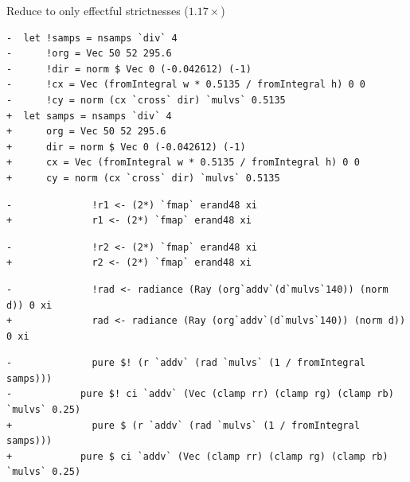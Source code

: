 \documentclass[8pt]{beamer}
\begin{document}

\begin{frame}[fragile]{Reduce to only effectful strictnesses ($1.17\times$)}
\begin{verbatim}
-  let !samps = nsamps `div` 4
-      !org = Vec 50 52 295.6
-      !dir = norm $ Vec 0 (-0.042612) (-1)
-      !cx = Vec (fromIntegral w * 0.5135 / fromIntegral h) 0 0
-      !cy = norm (cx `cross` dir) `mulvs` 0.5135
+  let samps = nsamps `div` 4
+      org = Vec 50 52 295.6
+      dir = norm $ Vec 0 (-0.042612) (-1)
+      cx = Vec (fromIntegral w * 0.5135 / fromIntegral h) 0 0
+      cy = norm (cx `cross` dir) `mulvs` 0.5135
\end{verbatim}
\begin{verbatim}
-              !r1 <- (2*) `fmap` erand48 xi
+              r1 <- (2*) `fmap` erand48 xi
\end{verbatim}

\begin{verbatim}
-              !r2 <- (2*) `fmap` erand48 xi
+              r2 <- (2*) `fmap` erand48 xi
\end{verbatim}

\begin{verbatim}
-              !rad <- radiance (Ray (org`addv`(d`mulvs`140)) (norm d)) 0 xi
+              rad <- radiance (Ray (org`addv`(d`mulvs`140)) (norm d)) 0 xi
\end{verbatim}

\begin{verbatim}
-              pure $! (r `addv` (rad `mulvs` (1 / fromIntegral samps)))
-            pure $! ci `addv` (Vec (clamp rr) (clamp rg) (clamp rb) `mulvs` 0.25)
+              pure $ (r `addv` (rad `mulvs` (1 / fromIntegral samps)))
+            pure $ ci `addv` (Vec (clamp rr) (clamp rg) (clamp rb) `mulvs` 0.25)
\end{verbatim}

\end{frame}

\end{document}
